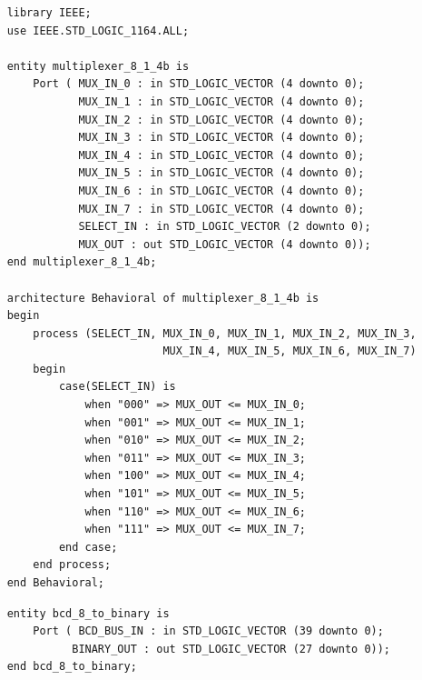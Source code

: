 \documentclass[11pt]{article}
\newenvironment{code}{\captionsetup{type=listing}}{}
\begin{document}
\vspace*{1cm}

\begin{code}
	\begin{verbatim}
    library IEEE;
    use IEEE.STD_LOGIC_1164.ALL;
    
    entity multiplexer_8_1_4b is
        Port ( MUX_IN_0 : in STD_LOGIC_VECTOR (4 downto 0);
               MUX_IN_1 : in STD_LOGIC_VECTOR (4 downto 0);
               MUX_IN_2 : in STD_LOGIC_VECTOR (4 downto 0);
               MUX_IN_3 : in STD_LOGIC_VECTOR (4 downto 0);
               MUX_IN_4 : in STD_LOGIC_VECTOR (4 downto 0);
               MUX_IN_5 : in STD_LOGIC_VECTOR (4 downto 0);
               MUX_IN_6 : in STD_LOGIC_VECTOR (4 downto 0);
               MUX_IN_7 : in STD_LOGIC_VECTOR (4 downto 0);
               SELECT_IN : in STD_LOGIC_VECTOR (2 downto 0);
               MUX_OUT : out STD_LOGIC_VECTOR (4 downto 0));
    end multiplexer_8_1_4b;
    
    architecture Behavioral of multiplexer_8_1_4b is
    begin
        process (SELECT_IN, MUX_IN_0, MUX_IN_1, MUX_IN_2, MUX_IN_3,
                            MUX_IN_4, MUX_IN_5, MUX_IN_6, MUX_IN_7)
        begin
            case(SELECT_IN) is
                when "000" => MUX_OUT <= MUX_IN_0;
                when "001" => MUX_OUT <= MUX_IN_1;
                when "010" => MUX_OUT <= MUX_IN_2;
                when "011" => MUX_OUT <= MUX_IN_3;
                when "100" => MUX_OUT <= MUX_IN_4;
                when "101" => MUX_OUT <= MUX_IN_5;
                when "110" => MUX_OUT <= MUX_IN_6;
                when "111" => MUX_OUT <= MUX_IN_7;
            end case;
        end process;
    end Behavioral;
  \end{verbatim}
	\captionsetup{belowskip=0pt}
	\label{code:8x5_to_5_multiplexer}
\end{code}

\vspace*{1cm}

\begin{code}
	\begin{verbatim}
    entity bcd_8_to_binary is
        Port ( BCD_BUS_IN : in STD_LOGIC_VECTOR (39 downto 0);
              BINARY_OUT : out STD_LOGIC_VECTOR (27 downto 0));
    end bcd_8_to_binary;
  \end{verbatim}
	\captionsetup{belowskip=0pt}
	\label{code:bcd_to_binary}
\end{code}
\end{document}
